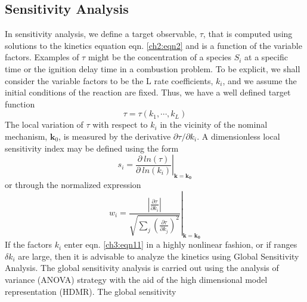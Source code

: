 \subsection{Sensitivity Analysis}
In sensitivity analysis, we define a
target observable, $\tau$, that is computed using solutions to the
kinetics equation eqn. \ref{ch2:eqn2} and is a function of the variable factors.
Examples of $\tau$ might be the concentration of a species $S_i$ at a
specific time or the ignition delay time in a combustion
problem. To be explicit, we shall consider the variable factors to
be the L rate coefficients, $k_i$, and we assume the initial
conditions of the reaction are fixed. Thus, we have a well defined
target function
\begin{equation}
\label{ch3:eqn11}
\tau = \tau(k_1, \cdots, k_L)
\end{equation}
The local variation of $\tau$ with respect to $k_i$ in the vicinity of the
nominal mechanism, $\mathbf{k}_0$, is measured by the derivative ${\partial \tau}/{\partial k_i}$. A
dimensionless local sensitivity index may be defined using the form
\begin{equation}
\label{ch3:eqn12}
s_i = \left. \frac{\partial ~ ln(\tau)}{\partial ~ ln(k_i)} \right\vert_{\mathbf{k}=\mathbf{k_0}}
\end{equation}
or through the normalized expression
\begin{equation}
\label{ch3:eqn13}
w_i = \left. \frac{ \left\vert \frac{\partial \tau}{\partial k_i} \right\vert }{\sqrt{\sum_j{\left(  \frac{\partial \tau}{\partial k_j} \right)^2 }}} \right\vert_{\mathbf{k}=\mathbf{k_0}}
\end{equation}
If the factors $k_i$ enter eqn. \ref{ch3:eqn11} in a highly nonlinear fashion, or
if ranges $\delta k_i$ are large, then it is advisable to analyze the kinetics using Global Sensitivity Analysis.\cite{ch1_IRPC_56_najm2009uncertainty,ch3_26_cukier1973study,ch3_27_cukier1975study,
ch3_28_mcrae1982global,ch1_IRPC_60_zador2005local,ch1_IRPC_60_zador2005local,ch1_IRPC_57_wang2015combustion,
ch1_IRPC_58_saltelli2008global,ch1_IRPC_59_scire2001comparison} The global sensitivity
analysis is carried out using the analysis of variance
(ANOVA)\cite{ch3_34_sobol2001global} strategy with the aid of the high dimensional
model representation (HDMR).\cite{ch3_35_rabitz1999general,ch1_IRPC_61_li2001high,ch1_IRPC_62_li2002practical,ch3_38_ziehn2008global,
ch3_39_ziehn2009gui,ch1_IRPC_63_ziehn2009global,ch1_IRPC_64_skodje2010theoretical,ch3_42_klippenstein2011uncertainty,
ch1_IRPC_65_davis2011global,ch1_IRPC_66_zhou2013multitarget} The global sensitivity
